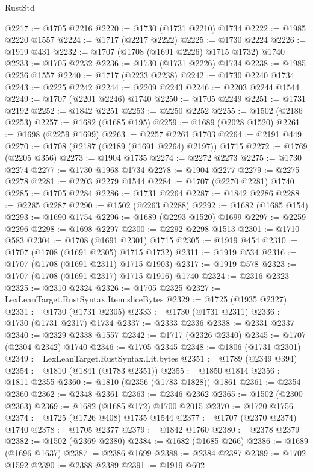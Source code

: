 \begin{lexlean}{RustStd}
\begin{coremodule}
@2217 := @1705 @2216
@2220 := @1730 (@1731 @2210) @1734
@2222 := @1985 @2220 @1557
@2224 := @1717 (@2217 @2222)
@2225 := @1730 @2224
@2226 := @1919 @431
@2232 := @1707 (@1708 (@1691 @2226) @1715 @1732) @1740
@2233 := @1705 @2232
@2236 := @1730 (@1731 @2226) @1734
@2238 := @1985 @2236 @1557
@2240 := @1717 (@2233 @2238)
@2242 := @1730 @2240 @1734
@2243 := @2225 @2242
@2244 := @2209 @2243
@2246 := @2203 @2244 @1544
@2249 := @1707 (@2201 @2246) @1740
@2250 := @1705 @2249
@2251 := @1731 @2192
@2252 := @1842 @2251
@2253 := @2250 @2252
@2255 := @1502 (@2186 @2253)
@2257 := @1682 (@1685 @195)
@2259 := @1689 (@2028 @1520)
@2261 := @1698 (@2259 @1699)
@2263 := @2257 @2261 @1703
@2264 := @2191 @449
@2270 := @1708 (@2187 (@2189 (@1691 @2264) @2197)) @1715
@2272 := @1769 (@2205 @356)
@2273 := @1904 @1735
@2274 := @2272 @2273
@2275 := @1730 @2274
@2277 := @1730 @1968 @1734
@2278 := @1904 @2277
@2279 := @2275 @2278
@2281 := @2203 @2279 @1544
@2284 := @1707 (@2270 @2281) @1740
@2285 := @1705 @2284
@2286 := @1731 @2264
@2287 := @1842 @2286
@2288 := @2285 @2287
@2290 := @1502 (@2263 @2288)
@2292 := @1682 (@1685 @154)
@2293 := @1690 @1754
@2296 := @1689 (@2293 @1520) @1699
@2297 := @2259 @2296
@2298 := @1698 @2297
@2300 := @2292 @2298 @1513
@2301 := @1710 @583
@2304 := @1708 (@1691 @2301) @1715
@2305 := @1919 @454
@2310 := @1707 (@1708 (@1691 @2305) @1715 @1732)
@2311 := @1919 @534
@2316 := @1707 (@1708 (@1691 @2311) @1715 @1903)
@2317 := @1919 @578
@2323 := @1707 (@1708 (@1691 @2317) @1715 @1916) @1740
@2324 := @2316 @2323
@2325 := @2310 @2324
@2326 := @1705 @2325
@2327 := LexLeanTarget.RustSyntax.Item.sliceBytes
@2329 := @1725 (@1935 @2327)
@2331 := @1730 (@1731 @2305)
@2333 := @1730 (@1731 @2311)
@2336 := @1730 (@1731 @2317) @1734
@2337 := @2333 @2336
@2338 := @2331 @2337
@2340 := @2329 @2338 @1557
@2342 := @1717 (@2326 @2340)
@2345 := @1707 (@2304 @2342) @1740
@2346 := @1705 @2345
@2348 := @1806 (@1731 @2301)
@2349 := LexLeanTarget.RustSyntax.Lit.bytes
@2351 := @1789 (@2349 @394)
@2354 := @1810 (@1841 (@1783 @2351))
@2355 := @1850 @1814
@2356 := @1811 @2355
@2360 := @1810 (@2356 (@1783 @1828)) @1861
@2361 := @2354 @2360
@2362 := @2348 @2361
@2363 := @2346 @2362
@2365 := @1502 (@2300 @2363)
@2369 := @1682 (@1685 @172) @1700 @2015
@2370 := @1720 @1756
@2374 := @1725 (@1726 @408) @1735 @1544
@2377 := @1707 (@2370 @2374) @1740
@2378 := @1705 @2377
@2379 := @1842 @1760
@2380 := @2378 @2379
@2382 := @1502 (@2369 @2380)
@2384 := @1682 (@1685 @266)
@2386 := @1689 (@1696 @1637)
@2387 := @2386 @1699
@2388 := @2384 @2387
@2389 := @1702 @1592
@2390 := @2388 @2389
@2391 := @1919 @602

\end{coremodule}
\end{lexlean}
